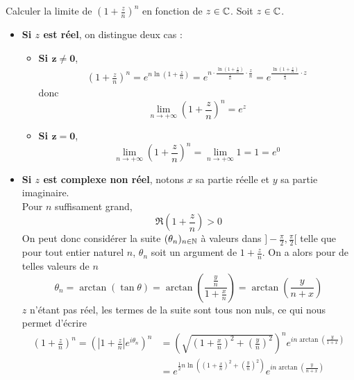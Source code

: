 \documentclass{article}
\begin{document}
\begin{question_kholle}{Calculer la limite de $\displaystyle
			\left(1+\frac{z}{n}\right)^{n}$ en fonction de $z\in\mathbb C$.}
	Soit $z\in\mathbb C$.
	\begin{itemize}[label=$\star$]
		\item \textbf{Si $z$ est réel}, on distingue deux cas :
		      \begin{itemize}
			      \item \textbf{Si $\bm{z\neq 0}$},
			            \begin{align*}
				            \left(1+\frac{z}{n}\right)^{n} = e^{n\ln
						            \left(1+\frac{z}{n}\right)} = e^{n\cdot \frac{\ln \left(1+
							            \frac{z}{n}\right)}{\frac{z}{n}}\cdot \frac{z}{n}} =
				            e^{\frac{\ln \left(1+\frac{z}{n}\right)}{\frac{z}{n}}\cdot z}
			            \end{align*}
			            donc
			            \[
				            \lim_{n\to +\infty} \left(1+\frac{z}{n}\right)^{n} = e^{z}
			            \]
			      \item \textbf{Si $\bm{z=0}$},
			            \[
				            \lim_{n\to+\infty}\left(1+\frac{z}{n}\right)^{n} =
				            \lim_{n\to+\infty}1=1=e^{0}
			            \]
		      \end{itemize}
		\item \textbf{Si $z$ est complexe non réel}, notons $x$ sa partie réelle et $y$ sa partie imaginaire.\\
		      Pour $n$ suffisament grand,
		      \[
			      \Re \left(1+\frac{z}{n}\right) > 0
		      \]
		      On peut donc considérer la suite $(\theta_{n})_{n\in\mathbb N}$ à valeurs dans $]-\frac{\pi}{2}, \frac{\pi}{2}[$ telle que pour tout entier naturel $n$, $\theta_{n}$ soit un argument de $1+\frac{z}{n}$. On a alors pour de telles valeurs de $n$
		      \[
			      \theta_{n} = \arctan(\tan \theta) = \arctan \left(\frac{\frac{y}{n}}{1+\frac{x}{n}}\right) = \arctan \left(\frac{y}{n+x}\right)
		      \]
		      $z$ n’étant pas réel, les termes de la suite sont tous non nuls, ce qui nous permet d’écrire
		      \begin{align*}
			      \left(1+\frac{z}{n}\right)^{n} = \left(\left|1+\frac{z}{n}\right|e^{i \theta_{n}}\right)^{n} & = \left(\sqrt{\left(1+\frac{x}{n}\right)^{2} + \left(\frac{y}{n}\right)^{2}}\right)^{n} e^{in\arctan \left(\frac{y}{1+x}\right)} \\ &= e^{\frac{1}{2}n \ln \left(\left(1+\frac{x}{n}\right)^{2} + \left(\frac{y}{n}\right)^{2}\right)} e^{in\arctan \left(\frac{y}{n+x}\right)}

\end{align*}
\end{itemize}
\end{question_kholle}
\end{document}
